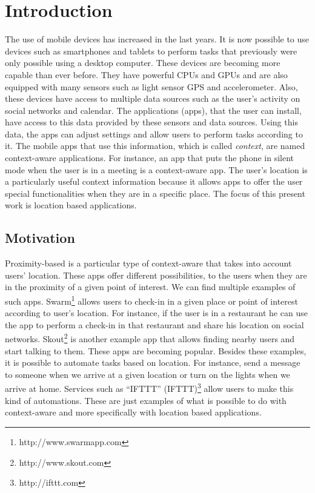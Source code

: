 
\chapter{Introduction}
\label{chapter:introduction}
The use of mobile devices has increased in the last years.
It is now possible to use devices such as smartphones and tablets to perform tasks that previously were only possible using a desktop computer.
These devices are becoming more capable than ever before.
They have powerful \glspl{CPU} and \glspl{GPU} and are also equipped with many sensors such as light sensor \gls{GPS} and accelerometer.
Also, these devices have access to multiple data sources such as
the user's activity on social networks and calendar.
The applications (apps), that the user can install, have access to this data provided by these sensors and data sources.
Using this data, the apps can adjust settings and allow users to perform tasks according to it.
The mobile apps that use this information, which is called \emph{context}, are named context-aware applications.
For instance, an app that puts the phone in silent mode when the user is in a meeting is a context-aware app.
The user's location is a particularly useful context information because it allows apps to offer the user special functionalities when they are in a specific place.
The focus of this present work is location based applications.

\section{Motivation}
\label{sec:introduction_motivation}
Proximity-based is a particular type of context-aware that takes into account users' location.
These apps offer different possibilities, to the users when they are in the proximity of a given point of interest.
We can find multiple examples of such apps.
Swarm\footnote{http://www.swarmapp.com} allows users to check-in in a given place or point of interest according to user's location.
For instance, if the user is in a restaurant he can use the app to perform a check-in in that restaurant and share his location on social networks.
Skout\footnote{http://www.skout.com}
is another example app that allows finding nearby users and start talking to them.
These apps are becoming popular.
Besides these examples, it is possible to automate tasks based on location.
For instance, send a message to someone when we arrive at a given location or turn on the lights when we arrive at home.
Services such as ``\acrlong{IFTTT}'' (\acrshort{IFTTT})\footnote{http://ifttt.com} allow users to make this kind of automations.
These are just examples of what is possible to do with context-aware and more specifically with location based applications.

